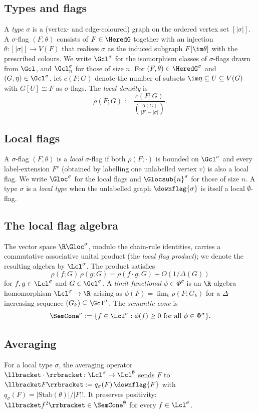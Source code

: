 \documentclass[11pt,a4paper]{article}
\theoremstyle{definition}
\theoremstyle{remark}
\begin{document}
\subsection{Types and flags}
A \emph{type} $\sigma$ is a (vertex- and edge-coloured) graph on the
ordered vertex set $[|\sigma|]$. A $\sigma$-flag $(F, \theta)$
consists of $F \in \HeredG$ together with an injection
$\theta\colon [|\sigma|] \to V(F)$ that realises $\sigma$ as the
induced subgraph $F[\im\theta]$ with the prescribed colours. We
write $\Gcl^\sigma$ for the isomorphism classes of $\sigma$-flags
drawn from $\Gcl$, and $\Gcl_n^\sigma$ for those of size $n$. For
$(F,\theta) \in \HeredG^\sigma$ and $(G,\eta) \in \Gcl^\sigma$, let
$c(F;G)$ denote the number of subsets $\im\eta \subseteq U \subseteq V(G)$
with $G[U] \cong F$ as $\sigma$-flags. The \emph{local density} is
\[
\rho(F; G) := \frac{c(F; G)}{\binom{\Delta(G)}{|F| - |\sigma|}}.
\]

\subsection{Local flags}
A $\sigma$-flag $(F, \theta)$ is a \emph{local} $\sigma$-flag if
both $\rho(F; \cdot)$ is bounded on $\Gcl^\sigma$ and every
label-extension $F^v$ (obtained by labelling one unlabelled vertex
$v$) is also a local flag. We write $\Gloc^\sigma$ for the local
flags and $\Glocsub{n}^\sigma$ for those of size $n$. A type
$\sigma$ is a \emph{local type} when the unlabelled graph
$\downflag{\sigma}$ is itself a local $\emptyset$-flag.

\subsection{The local flag algebra}
The vector space $\R\Gloc^\sigma$, modulo the chain-rule identities,
carries a commutative associative unital product (the \emph{local
flag product}); we denote the resulting algebra by $\Lcl^\sigma$.
The product satisfies
\[
\rho(f; G)\,\rho(g; G) = \rho(f \cdot g; G) + O(1/\Delta(G))
\]
for $f, g \in \Lcl^\sigma$ and $G \in \Gcl^\sigma$. A \emph{limit
functional} $\phi \in \Phi^\sigma$ is an $\R$-algebra homomorphism
$\Lcl^\sigma \to \R$ arising as $\phi(F) = \lim_k \rho(F; G_k)$ for
a $\Delta$-increasing sequence $(G_k) \subseteq \Gcl^\sigma$. The
\emph{semantic cone} is
\[
\SemCone^\sigma := \{ f \in \Lcl^\sigma : \phi(f) \geq 0
\text{ for all } \phi \in \Phi^\sigma \}.
\]

\subsection{Averaging}
For a local type $\sigma$, the averaging operator
$\llbracket \cdot \rrbracket\colon \Lcl^\sigma \to \Lcl^\emptyset$
sends $F$ to $\llbracket F \rrbracket := q_\sigma(F)\,\downflag{F}$
with $q_\sigma(F) = |\mathrm{Stab}(\theta)| / |F|!$. It preserves
positivity: $\llbracket f^2 \rrbracket \in \SemCone^\emptyset$ for
every $f \in \Lcl^\sigma$.
\end{document}
